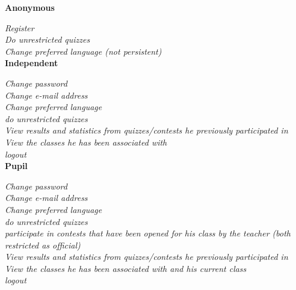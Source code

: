 \textbf{Anonymous}


    \textit{Register}\\
	\textit{Do unrestricted quizzes}\\
    \textit{Change preferred language (not persistent)}\\

\textbf{Independent}

    \textit{Change password}\\
    \textit{Change e-mail address}\\
    \textit{Change preferred language}\\
    \textit{do unrestricted quizzes}\\
    \textit{View results and statistics from quizzes/contests he previously participated in}\\
    \textit{View the classes he has been associated with}\\
    \textit{logout}\\

\textbf{Pupil}

    \textit{Change password}\\
    \textit{Change e-mail address}\\
    \textit{Change preferred language}\\
    \textit{do unrestricted quizzes}\\
    \textit{participate in contests that have been opened for his class by the teacher (both restricted as official)}\\
    \textit{View results and statistics from quizzes/contests he previously participated in}\\
    \textit{View the classes he has been associated with and his current class}\\
	\textit{logout}
